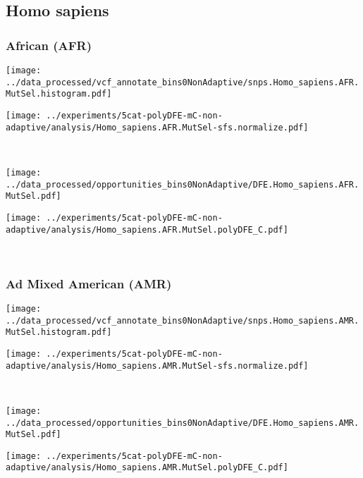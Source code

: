 \subsection{Homo sapiens}

\subsubsection{African (AFR)}

\begin{minipage}{0.49\linewidth}
    \texttt{[image: ../data\_processed/vcf\_annotate\_bins0NonAdaptive/snps.Homo\_sapiens.AFR.MutSel.histogram.pdf]}
\end{minipage}
\begin{minipage}{0.49\linewidth}
    \texttt{[image: ../experiments/5cat-polyDFE-mC-non-adaptive/analysis/Homo\_sapiens.AFR.MutSel-sfs.normalize.pdf]}
\end{minipage}
\\
\begin{minipage}{0.49\linewidth}
    \texttt{[image: ../data\_processed/opportunities\_bins0NonAdaptive/DFE.Homo\_sapiens.AFR.MutSel.pdf]}
\end{minipage}
\begin{minipage}{0.49\linewidth}
    \texttt{[image: ../experiments/5cat-polyDFE-mC-non-adaptive/analysis/Homo\_sapiens.AFR.MutSel.polyDFE\_C.pdf]}
\end{minipage}
\\

\subsubsection{Ad Mixed American (AMR)}

\begin{minipage}{0.49\linewidth}
    \texttt{[image: ../data\_processed/vcf\_annotate\_bins0NonAdaptive/snps.Homo\_sapiens.AMR.MutSel.histogram.pdf]}
\end{minipage}
\begin{minipage}{0.49\linewidth}
    \texttt{[image: ../experiments/5cat-polyDFE-mC-non-adaptive/analysis/Homo\_sapiens.AMR.MutSel-sfs.normalize.pdf]}
\end{minipage}
\\
\begin{minipage}{0.49\linewidth}
    \texttt{[image: ../data\_processed/opportunities\_bins0NonAdaptive/DFE.Homo\_sapiens.AMR.MutSel.pdf]}
\end{minipage}
\begin{minipage}{0.49\linewidth}
    \texttt{[image: ../experiments/5cat-polyDFE-mC-non-adaptive/analysis/Homo\_sapiens.AMR.MutSel.polyDFE\_C.pdf]}
\end{minipage}
\\

